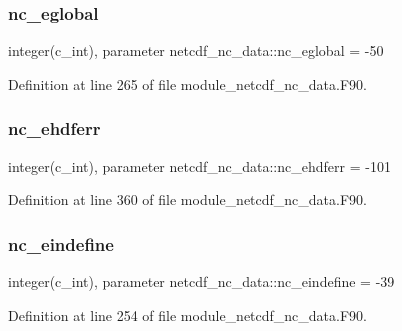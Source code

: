 \mbox{\label{namespacenetcdf__nc__data_a4bf9349dddd9a80ce363bb89be890f29}} 
\subsubsection{\texorpdfstring{nc\+\_\+eglobal}{nc\_eglobal}}
{\footnotesize\ttfamily integer(c\+\_\+int), parameter netcdf\+\_\+nc\+\_\+data\+::nc\+\_\+eglobal = -\/50}



Definition at line 265 of file module\+\_\+netcdf\+\_\+nc\+\_\+data.\+F90.

\mbox{\label{namespacenetcdf__nc__data_a1169af4f3c40cf31b785e21f2dbd5ec0}} 
\subsubsection{\texorpdfstring{nc\+\_\+ehdferr}{nc\_ehdferr}}
{\footnotesize\ttfamily integer(c\+\_\+int), parameter netcdf\+\_\+nc\+\_\+data\+::nc\+\_\+ehdferr = -\/101}



Definition at line 360 of file module\+\_\+netcdf\+\_\+nc\+\_\+data.\+F90.

\mbox{\label{namespacenetcdf__nc__data_ad19d2f76daf245eedf8e951ee0d82a3a}} 
\subsubsection{\texorpdfstring{nc\+\_\+eindefine}{nc\_eindefine}}
{\footnotesize\ttfamily integer(c\+\_\+int), parameter netcdf\+\_\+nc\+\_\+data\+::nc\+\_\+eindefine = -\/39}



Definition at line 254 of file module\+\_\+netcdf\+\_\+nc\+\_\+data.\+F90.


